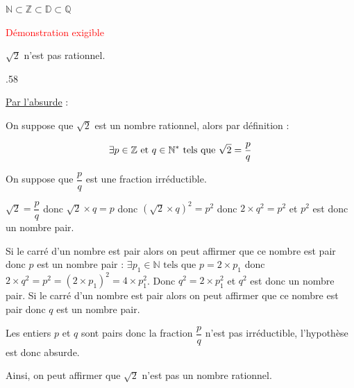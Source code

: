 \begin{pageCours}
{\begin{Rq}
$\mathbb{N}\subset\mathbb{Z}\subset\mathbb{D}\subset\mathbb{Q}$
\end{Rq}

\begin{Pp}
\textcolor{red}{Démonstration exigible}

$\sqrt{2}$ n'est pas rationnel.
\end{Pp}
}{.58\linewidth}{
\begin{Pv}
\underline{Par l'absurde} :

On suppose que $\sqrt{2}$ est un nombre rationnel, alors par définition : 

\[\exists p\in\mathbb Z \text{ et }q\in\mathbb N^{\ast}\text{ tels que }\sqrt{2}=\dfrac{p}{q}\]

On suppose que $\dfrac{p}{q}$ est une fraction irréductible.

$\sqrt{2}=\dfrac{p}{q}$ donc $\sqrt{2}\times q=p$ donc $(\sqrt{2}\times q)^2=p^2$ donc $2\times q^2=p^2$ et $p^2$ est donc un nombre pair.

Si le carré d'un nombre est pair alors on peut affirmer que ce nombre est pair donc $p$ est un nombre pair : $\exists p_1\in\mathbb{N}\text{ tels que }p=2\times p_1$ donc $2\times q^2=p^2=(2\times p_1)^2=4\times p_1^2$. Donc $q^2=2\times p_1^2$ et $q^2$ est donc un nombre pair. Si le carré d'un nombre est pair alors on peut affirmer que ce nombre est pair donc $q$ est un nombre pair.

Les entiers $p$ et $q$ sont pairs donc la fraction $\dfrac{p}{q}$ n'est pas irréductible, l'hypothèse est donc absurde.

Ainsi, on peut affirmer que $\sqrt{2}$ n'est pas un nombre rationnel.
\end{Pv}
}




\end{pageCours} %


